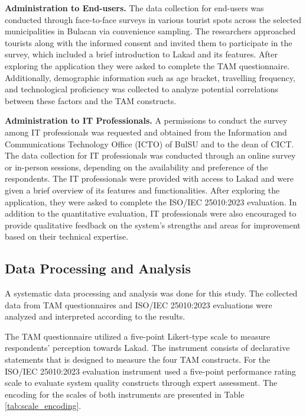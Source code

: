 \textbf{Administration to End-users.} The data collection for end-users was conducted through face-to-face surveys in various tourist spots across the selected municipalities in Bulacan via convenience sampling. The researchers approached tourists along with the informed consent and invited them to participate in the survey, which included a brief introduction to Lakad and its features. After exploring the application they were asked to complete the TAM questionnaire. Additionally, demographic information such as age bracket, travelling frequency, and technological proficiency was collected to analyze potential correlations between these factors and the TAM constructs. %


\textbf{Administration to IT Professionals.} A permissions to conduct the survey among IT professionals was requested and obtained from the Information and Communications Technology Office (ICTO) of BulSU and to the dean of CICT. The data collection for IT professionals was conducted through an online survey or in-person sessions, depending on the availability and preference of the respondents. The IT professionals were provided with access to Lakad and were given a brief overview of its features and functionalities. After exploring the application, they were asked to complete the ISO/IEC 25010:2023 evaluation. In addition to the quantitative evaluation, IT professionals were also encouraged to provide qualitative feedback on the system’s strengths and areas for improvement based on their technical expertise.  

\subsection{Data Processing and Analysis}

A systematic data processing and analysis was done for this study. The collected data from TAM questionnaires and ISO/IEC 25010:2023 evaluations were analyzed and interpreted according to the results.

The TAM questionnaire utilized a five-point Likert-type scale to measure respondents’ perception towards Lakad. The instrument consists of declarative statements that is designed to measure the four TAM constructs. For the ISO/IEC 25010:2023 evaluation instrument used a five-point performance rating scale to evaluate system quality constructs through expert assessment. The encoding for the scales of both instruments are presented in Table \ref{tab:scale_encoding}.

